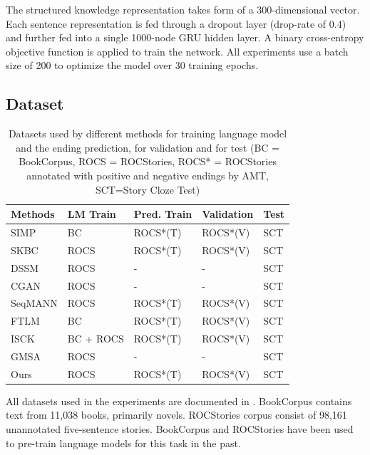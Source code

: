 The structured knowledge representation takes form of a 
300-dimensional vector. 
Each sentence representation is fed through a dropout layer 
(drop-rate of 0.4) and further fed into a single 1000-node 
GRU hidden layer. 
A binary cross-entropy objective function is 
applied to train the network. All experiments use a batch size of 
200 to optimize the model over 30 training epochs. 


\subsection{Dataset}
\label{sec:dataset}

\begin{table}[th]
\small
\begin{tabular}{lllll} \hline
\bf{Methods} & LM Train & Pred. Train & Validation & Test \\ \hline \hline
SIMP & BC & ROCS*(T)& ROCS*(V)& SCT \\ \hline
SKBC & ROCS & ROCS*(T)& ROCS*(V)& SCT\\ \hline
DSSM & ROCS & -  & - &  SCT\\ \hline
CGAN & ROCS & - & - &  SCT\\ \hline
SeqMANN & ROCS & ROCS*(T)& ROCS*(V)& SCT\\ \hline
FTLM & BC &  ROCS*(T)& ROCS*(V)& SCT\\ \hline
ISCK & BC + ROCS & ROCS*(T) & ROCS*(V) & SCT \\ \hline
GMSA & ROCS & - & - & SCT \\ \hline
Ours & ROCS &ROCS*(T) &ROCS*(V) & SCT \\ \hline
\end{tabular}
\caption{Datasets used by different methods for training
language model and the ending prediction, for validation and
for test
(BC = BookCorpus,
ROCS = ROCStories, ROCS* = ROCStories annotated with positive and 
negative endings by AMT,
SCT=Story Cloze Test)}
\label{tab:datasets}
\end{table}

All datasets used in the experiments are documented in
. BookCorpus contains text from
11,038 books, primarily novels.  
ROCStories corpus consist of 98,161 unannotated five-sentence 
stories. BookCorpus and ROCStories have been used to pre-train
language models for this task in the past.

